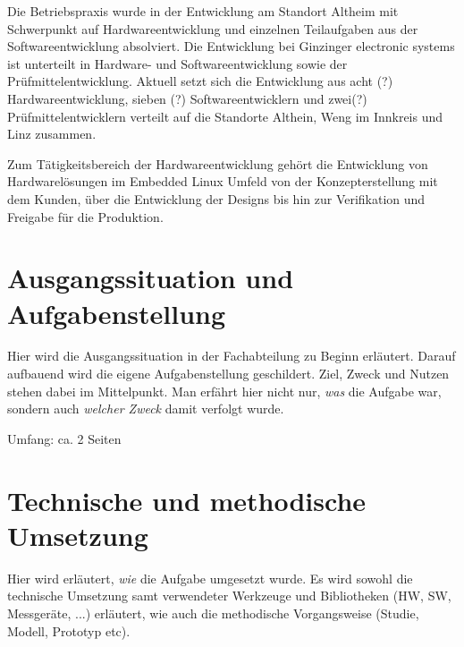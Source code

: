 \documentclass[praktikum,german]{hgbthesis}
\begin{document}


Die Betriebspraxis wurde in der Entwicklung am Standort Altheim mit Schwerpunkt auf Hardwareentwicklung 
und einzelnen Teilaufgaben aus der Softwareentwicklung absolviert. 
Die Entwicklung bei Ginzinger electronic systems ist unterteilt in Hardware- und Softwareentwicklung sowie der 
Prüfmittelentwicklung. Aktuell setzt sich die Entwicklung aus acht (?) Hardwareentwicklung, sieben (?) 
Softwareentwicklern und zwei(?) Prüfmittelentwicklern verteilt auf die Standorte Althein, Weng im Innkreis und 
Linz zusammen.

Zum Tätigkeitsbereich der Hardwareentwicklung gehört die Entwicklung von Hardwarelösungen im Embedded Linux 
Umfeld von der Konzepterstellung mit dem Kunden, über die Entwicklung der Designs bis hin zur Verifikation und 
Freigabe für die Produktion. 


\chapter{Ausgangssituation und Aufgabenstellung}
\color{blue}
Hier wird die Ausgangssituation in der Fachabteilung zu Beginn erläutert. Darauf aufbauend wird die eigene Aufgabenstellung geschildert. Ziel, Zweck und Nutzen stehen dabei im Mittelpunkt. Man erfährt hier nicht nur, \emph{was} die Aufgabe war, sondern auch \emph{welcher Zweck} damit verfolgt wurde.

\vskip 8mm
Umfang: ca. 2 Seiten
\color{black}


\chapter{Technische und methodische Umsetzung}
\color{blue}
Hier wird erläutert, \emph{wie} die Aufgabe umgesetzt wurde. Es wird sowohl die technische Umsetzung samt verwendeter Werkzeuge und Bibliotheken (HW, SW, Messgeräte, ...) erläutert, wie auch die methodische Vorgangsweise (Studie, Modell, Prototyp etc).
\end{document}
